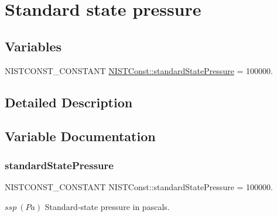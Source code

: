 \hypertarget{group___n_i_s_t_const-_standard_state_pressure}{}\section{Standard state pressure}
\label{group___n_i_s_t_const-_standard_state_pressure}
\subsection*{Variables}
\begin{DoxyCompactItemize}
\item 
N\+I\+S\+T\+C\+O\+N\+S\+T\+\_\+\+C\+O\+N\+S\+T\+A\+NT \mbox{\hyperlink{group___n_i_s_t_const-_standard_state_pressure_gaf350fe751c6d2280b7712dcad3ac025f}{N\+I\+S\+T\+Const\+::standard\+State\+Pressure}} = 100000.
\end{DoxyCompactItemize}


\subsection{Detailed Description}


\subsection{Variable Documentation}
\mbox{\label{group___n_i_s_t_const-_standard_state_pressure_gaf350fe751c6d2280b7712dcad3ac025f}} 
\subsubsection{\texorpdfstring{standard\+State\+Pressure}{standardStatePressure}}
{\footnotesize\ttfamily N\+I\+S\+T\+C\+O\+N\+S\+T\+\_\+\+C\+O\+N\+S\+T\+A\+NT N\+I\+S\+T\+Const\+::standard\+State\+Pressure = 100000.}

$ssp \ (Pa)$ Standard-\/state pressure in pascals. 